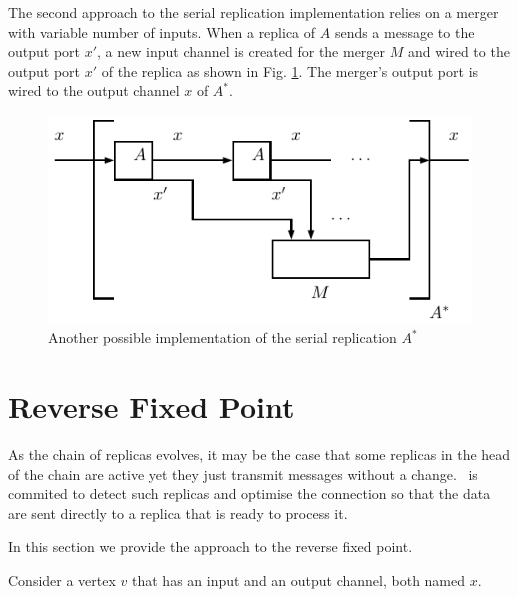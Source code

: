 The second approach to the serial replication implementation relies on a merger with variable number of inputs. When a replica of $A$ sends a message to the output port $x'$, a new input channel is created for the merger $M$ and wired to the output port $x'$ of the replica as shown in Fig. \ref{fig:ffp_new_1}. The merger's output port is wired to the output channel $x$ of $A^{*}$.
\begin{figure}[h]
\centering
\includegraphics[scale=0.8]{figs/chapter_04_ffp_new_1.pdf}
\caption{Another possible implementation of the serial replication $A^{*}$}
\label{fig:ffp_new_1}
\end{figure}




    \section{Reverse Fixed Point\label{rfp}}
As the chain of replicas evolves, it may be the case that some replicas in the head of the chain are active yet they just transmit messages without a change. \ak\ is commited to detect such replicas and optimise the connection so that the data are sent directly to a replica that is ready to process it. 

In this section we provide the approach to the reverse fixed point.

Consider a vertex $v$ that has an input and an output channel, both named $x$.

